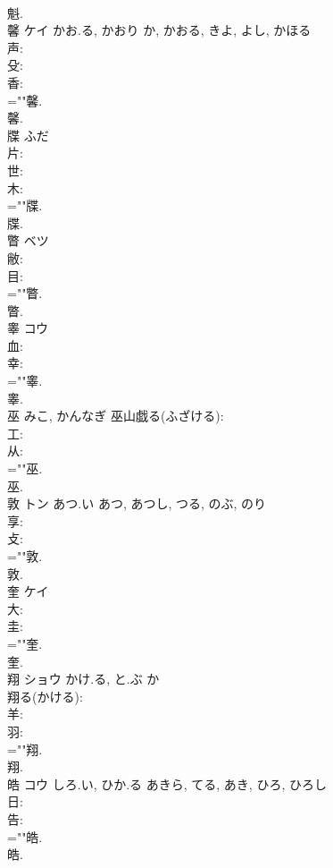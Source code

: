\documentclass[8pt]{extreport}
\begin{document}
\begin{CJK}{UTF8}{min}
\\	魁.
\\	馨	ケイ	かお.る, かおり	か, かおる, きよ, よし, かほる	
\\	声: 
\\	殳: 
\\	香: 
\\	=""馨.
\\	馨.
\\	牒		ふだ				
\\	片: 
\\	世: 
\\	木: 
\\	=""牒.
\\	牒.
\\	瞥	ベツ			
\\	敝: 
\\	目: 
\\	=""瞥.
\\	瞥.
\\	睾	コウ			
\\	血: 
\\	幸: 
\\	=""睾.
\\	睾.
\\	巫		みこ, かんなぎ			巫山戯る(ふざける): 
\\	工: 
\\	从: 
\\	=""巫.
\\	巫.
\\	敦	トン	あつ.い	あつ, あつし, つる, のぶ, のり	
\\	享: 
\\	攴: 
\\	=""敦.
\\	敦.
\\	奎	ケイ			
\\	大: 
\\	圭: 
\\	=""奎.
\\	奎.
\\	翔	ショウ	かけ.る, と.ぶ	か	
\\	翔る(かける): 
\\	羊: 
\\	羽: 
\\	=""翔.
\\	翔.
\\	皓	コウ	しろ.い, ひか.る	あきら, てる, あき, ひろ, ひろし	
\\	日: 
\\	告: 
\\	=""皓.
\\	皓.

\end{CJK}
\end{document}
